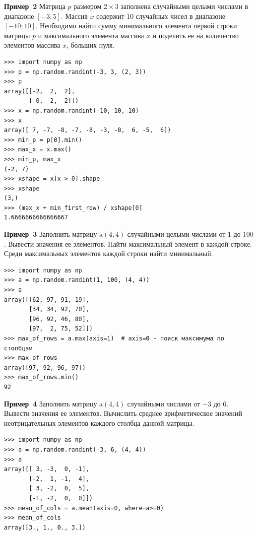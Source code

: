 \documentclass[aspectratio=169, mathserif]{beamer}%
\begin{document}
\begin{frame}[fragile]{\textcolor{tpugreen}{\textbf{Пример~2}}}
\scriptsize
Матрица $p$ размером $2 \times 3$ заполнена случайными целыми числами в диапазоне $\left[-3; 5\right]$. Массив $x$ содержит $10$ случайных чисел в диапазоне $\left[-10; 10\right]$. Необходимо найти сумму минимального элемента первой строки матрицы $p$ и максимального элемента массива $x$ и поделить ее на количество элементов массива $x$, больших нуля.
\vfill
\begin{verbatim}
>>> import numpy as np
>>> p = np.random.randint(-3, 3, (2, 3))
>>> p
array([[-2,  2,  2],
       [ 0, -2,  2]])
>>> x = np.random.randint(-10, 10, 10)
>>> x
array([ 7, -7, -8, -7, -8, -3, -8,  6, -5,  6])
>>> min_p = p[0].min()
>>> max_x = x.max()
>>> min_p, max_x
(-2, 7)
>>> xshape = x[x > 0].shape
>>> xshape
(3,)
>>> (max_x + min_first_row) / xshape[0]
1.6666666666666667
\end{verbatim}
\vfill
\end{frame}

\begin{frame}[fragile]{\textcolor{tpugreen}{\textbf{Пример~3}}}
\scriptsize
Заполнить матрицу $\mathrm{a}(4, 4)$ случайными целыми числами от $1$ до $100$. Вывести значения ее элементов. Найти максимальный элемент в каждой строке. Среди максимальных элементов каждой строки найти минимальный.
\vfill
\begin{verbatim}
>>> import numpy as np
>>> a = np.random.randint(1, 100, (4, 4))
>>> a
array([[62, 97, 91, 19],
       [34, 34, 92, 70],
       [96, 92, 46, 80],
       [97,  2, 75, 52]])
>>> max_of_rows = a.max(axis=1)  # axis=0 - поиск максимума по столбцам
>>> max_of_rows
array([97, 92, 96, 97])
>>> max_of_rows.min()
92
\end{verbatim}
\vfill
\end{frame}

\begin{frame}[fragile]{\textcolor{tpugreen}{\textbf{Пример~4}}}
\scriptsize
Заполнить матрицу $\mathrm{a}(4, 4)$ случайными числами от $-3$ до $6$. Вывести значения ее элементов. Вычислить среднее арифметическое значений неотрицательных элементов каждого столбца данной матрицы.
\vfill
\begin{verbatim}
>>> import numpy as np
>>> a = np.random.randint(-3, 6, (4, 4))
>>> a
array([[ 3, -3,  0, -1],
       [-2,  1, -1,  4],
       [ 3, -2,  0,  5],
       [-1, -2,  0,  0]])
>>> mean_of_cols = a.mean(axis=0, where=a>=0)
>>> mean_of_cols
array([3., 1., 0., 3.])
\end{verbatim}
\vfill
\end{frame}
\end{document}
